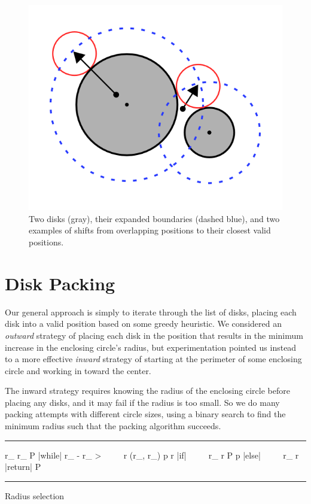 \documentclass{article}
\begin{document}
\begin{figure}
\centering
\includegraphics[scale=0.3]{expand}
\caption{Two disks (gray), their expanded boundaries
  (dashed blue), and two examples of shifts from overlapping
  positions to their closest valid positions.}
\label{fig:expand}
\end{figure}

\section{Disk Packing}

Our general approach is simply to iterate through the list
of disks, placing each disk into a valid position based on
some greedy heuristic.
We considered an {\it outward} strategy of placing each disk
in the position that results in the minimum increase in the
enclosing circle's radius, but experimentation pointed us
instead to a more effective  {\it inward} strategy of
starting at the perimeter of some enclosing circle and
working in toward the center.

The inward strategy requires knowing the radius of the
enclosing circle before placing any disks, and it may fail
if the radius is too small.
So we do many packing attempts with different circle sizes,
using a binary search to find the minimum radius such that
the packing algorithm succeeds.

\begin{algorithm}
\hrule\vspace{10pt}
\begin{program}
r_ \leftarrow {}
r_ \leftarrow {}
P \leftarrow \bot
|while| \; r_ - r_ > \varepsilon
~~~~\tab%
  r \leftarrow {}(r_, r_)
  p \leftarrow {} \; r
  |if| \; 
  ~~~~\tab%
    r_ \leftarrow r
    P \leftarrow p
  \untab
  |else|
  ~~~~\tab%
    r_ \leftarrow r
  \untab
\untab
|return| \; P
\end{program}
\hrule
\caption{Radius selection}
\end{algorithm}
\end{document}
